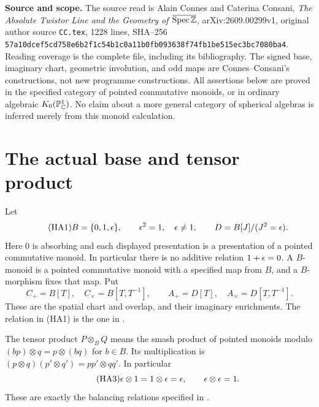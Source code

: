 


\noindent\textbf{Source and scope.}
The source read is Alain Connes and Caterina Consani, \emph{The Absolute
Twistor Line and the Geometry of $\overline{\operatorname{Spec}\mathbb Z}$},
arXiv:2609.00299v1, original author source \texttt{CC.tex}, 1228 lines,
SHA--256
\texttt{57a10dcef5cd758e6b2f1c54b1c0a11b0fb093638f74fb1be515ec3bc7080ba4}.
Reading coverage is the complete file, including its bibliography.
The signed base, imaginary chart, geometric involution, and odd maps are
Connes--Consani's constructions, not new programme constructions.
All assertions below are proved in the specified category of pointed
commutative monoids, or in ordinary algebraic $K_0(\mathbb P^1_\mathbb C)$.
No claim about a more general category of spherical algebras is inferred
merely from this monoid calculation.

\section{The actual base and tensor product}

Let
\begin{equation}\tag{HA1}
 B=\{0,1,\epsilon\},\qquad \epsilon^2=1,\quad \epsilon\ne1,
 \qquad D=B[J]/(J^2=\epsilon).
\end{equation}
Here $0$ is absorbing and each displayed presentation is a presentation
of a pointed commutative monoid. In particular there is no additive
relation $1+\epsilon=0$. A $B$-monoid is a pointed commutative monoid with a
specified map from $B$, and a $B$-morphism fixes that map. Put
\begin{equation}\tag{HA2}
 C_+=B[T],\quad C_\times=B[T,T^{-1}],\qquad
 A_+=D[T],\quad A_\times=D[T,T^{-1}].
\end{equation}
These are the spatial chart and overlap, and their imaginary enrichments.
The relation in (HA1) is the one in .

The tensor product $P\otimes_B Q$ means the smash product of pointed
monoids modulo $(bp)\otimes q=p\otimes(bq)$ for $b\in B$.
Its multiplication is
$(p\otimes q)(p'\otimes q')=pp'\otimes qq'$. In particular
\begin{equation}\tag{HA3}
 \epsilon\otimes1=1\otimes\epsilon=\epsilon,
 \qquad \epsilon\otimes\epsilon=1.
\end{equation}
These are exactly the balancing relations specified in
.

